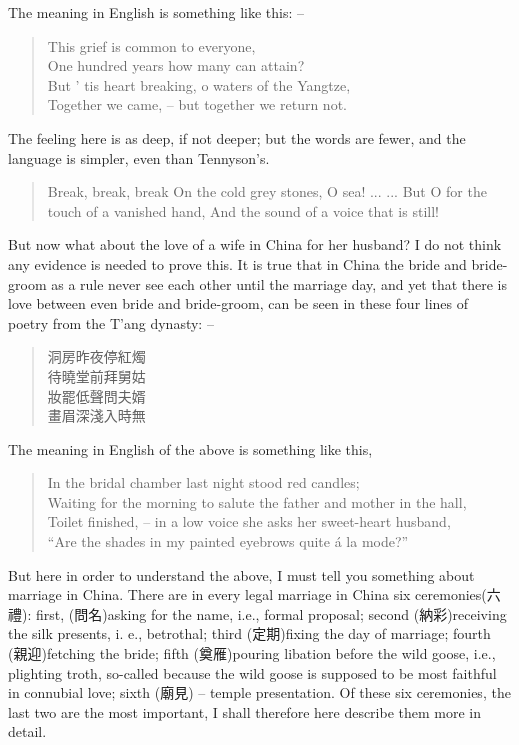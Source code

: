 The meaning in English is something like this: --
\begin{quote}
This grief is common to everyone, \\
One hundred years how many can attain? \\
But ' tis heart breaking, o waters of the Yangtze, \\
Together we came,  -- but together we return not.
\end{quote}
The feeling here is as deep, if not deeper;
but the words are fewer, and the language is simpler, even than Tennyson's.
\begin{quote}
Break, break, break
On the cold grey stones, O sea!
... ...
But O for the touch of a vanished hand,
And the sound of a voice that is still!
\end{quote}
But now what about the love of a wife in China for her husband?
I do not think any evidence is needed to prove this.
It is true that in China the bride and bride-groom as a rule never see each other until the marriage day,
and yet that there is love between even bride and bride-groom,
can be seen in these four lines of poetry from the T'ang dynasty: --
\begin{quote}
洞房昨夜停紅燭 \\
待曉堂前拜舅姑 \\
妝罷低聲問夫婿 \\
畫眉深淺入時無
\end{quote}

The meaning in English of the above is something like this,
\begin{quote}
In the bridal chamber last night stood red candles; \\
Waiting for the morning to salute the father and mother in the hall, \\
Toilet finished, -- in a low voice she asks her sweet-heart husband, \\
``Are the shades in my painted eyebrows quite \'a la mode?''
\end{quote}
But here in order to understand the above,
I must tell you something about marriage in China.
There are in every legal marriage in China six ceremonies(六禮):
first, (問名)asking for the name, i.e., formal proposal;
second (納彩)receiving the silk presents, i. e., betrothal;
third (定期)fixing the day of marriage;
fourth (親迎)fetching the bride;
fifth (奠雁)pouring libation before the wild goose, i.e., plighting troth, so-called because the wild goose is supposed to be most faithful in connubial love;
sixth (廟見) -- temple presentation.
Of these six ceremonies, the last two are the most important,
I shall therefore here describe them more in detail.

